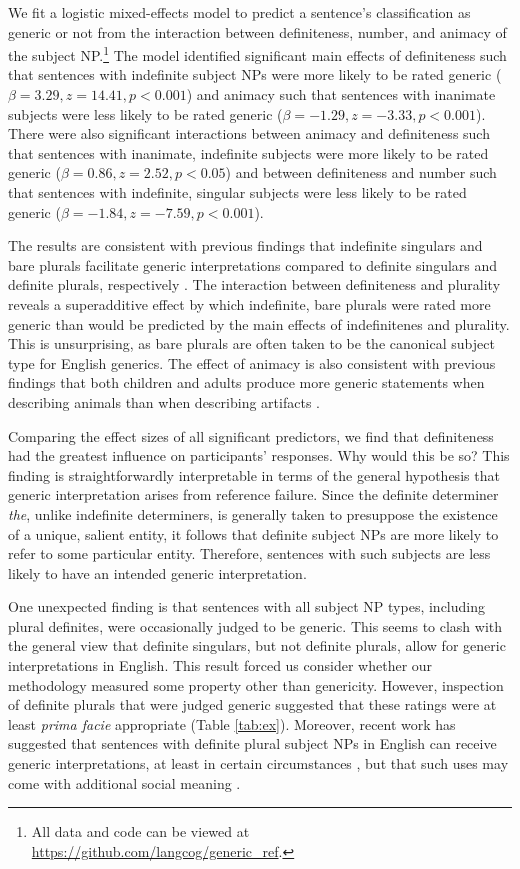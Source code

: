 \documentclass[10pt,letterpaper]{article}
\begin{document}
We fit a logistic mixed-effects model to predict a sentence's classification as generic or not from the interaction between definiteness, number, and animacy of the subject NP.\footnote{All data and code can be viewed at \url{https://github.com/langcog/generic_ref}.} The model identified significant main effects of definiteness such that sentences with indefinite subject NPs were more likely to be rated generic (\(\beta = 3.29, z = 14.41, p < 0.001\)) and animacy such that sentences with inanimate subjects were less likely to be rated generic (\(\beta = -1.29, z = -3.33, p < 0.001\)). There were also significant interactions between animacy and definiteness such that sentences with inanimate, indefinite subjects were more likely to be rated generic (\(\beta = 0.86, z = 2.52, p < 0.05\)) and between definiteness and number such that sentences with indefinite, singular subjects were less likely to be rated generic (\(\beta = -1.84, z = -7.59, p < 0.001\)).

The results are consistent with previous findings that indefinite singulars and bare plurals facilitate generic interpretations compared to definite singulars and definite plurals, respectively \cite{Cimpian:2011, Gelman:2003}. The interaction between definiteness and plurality reveals a superadditive effect by which indefinite, bare plurals were rated more generic than would be predicted by the main effects of indefinitenes and plurality. This is unsurprising, as bare plurals are often taken to be the canonical subject type for English generics. The effect of animacy is also consistent with previous findings that both children and adults produce more generic statements when describing animals than when describing artifacts \cite{Brandone:2009}.

Comparing the effect sizes of all significant predictors, we find that definiteness had the greatest influence on participants' responses. Why would this be so? This finding is straightforwardly interpretable in terms of the general hypothesis that generic interpretation arises from reference failure. Since the definite determiner \textit{the}, unlike indefinite determiners, is generally taken to presuppose the existence of a unique, salient entity, it follows that definite subject NPs are more likely to refer to some particular entity. Therefore, sentences with such subjects are less likely to have an intended generic interpretation.

One unexpected finding is that sentences with all subject NP types, including plural definites, were occasionally judged to be generic. This seems to clash with the general view that definite singulars, but not definite plurals, allow for generic interpretations in English. This result forced us consider whether our methodology measured some property other than genericity. However, inspection of definite plurals that were judged generic suggested that these ratings were at least \emph{prima facie} appropriate (Table \ref{tab:ex}). Moreover, recent work has suggested that sentences with definite plural subject NPs in English can receive generic interpretations, at least in certain circumstances \cite{FarkasDeSwart2007}, but that such uses may come with additional social meaning \cite{Acton:2014}. 
\end{document}
